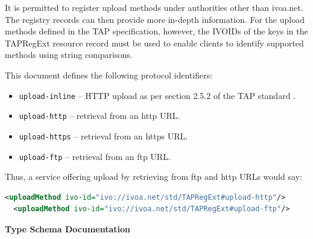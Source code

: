 \documentclass{ivoa}
\begin{document}
It is permitted to register upload methods under authorities other than
ivoa.net.
The registry records can then provide more in-depth information. For
the upload methods defined in the TAP specification, however, 
the IVOIDs of the keys in the TAPRegExt resource record must be used to enable
clients to identify supported methods using string comparisons.

This document defines the following protocol identifiers:


\begin{itemize}

\item \texttt{upload-inline} -- HTTP upload as per section 2.5.2 of 
the TAP standard \citep{std:TAP}.{}

\item \texttt{upload-http} -- retrieval from an http URL.{}

\item \texttt{upload-https} -- retrieval from an https URL.{}

\item \texttt{upload-ftp} -- retrieval from an ftp URL.{}

\end{itemize}

Thus, a service offering upload by retrieving from ftp and http URLs
would say:


\begin{lstlisting}[language=XML,basicstyle=\footnotesize]
  <uploadMethod ivo-id="ivo://ivoa.net/std/TAPRegExt#upload-http"/>
  <uploadMethod ivo-id="ivo://ivoa.net/std/TAPRegExt#upload-ftp"/>
\end{lstlisting}

\begingroup
      	\renewcommand*\descriptionlabel[1]{%
      	\hbox to 5.5em{\emph{#1}\hfil}}\vspace{2ex}\noindent\textbf{ Type Schema Documentation}


\end{document}
